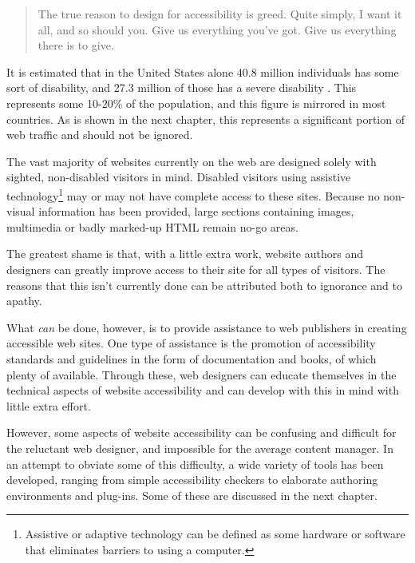 
\begin{quotation}

The true reason to design for accessibility is greed. Quite simply, I want it
all, and so should you. Give us everything you've got. Give us everything there
is to give.  \cite{joeclark}

\end{quotation}

It is estimated that in the United States alone 40.8 million individuals has
some sort of disability, and 27.3 million of those has a severe disability
\cite{webaim}. This represents some 10-20\% of the population, and this figure
is mirrored in most countries. As is shown in the next chapter, this represents
a significant portion of web traffic and should not be ignored.

The vast majority of websites currently on the web are designed solely with
sighted, non-disabled visitors in mind. Disabled visitors using assistive
technology\footnote{Assistive or adaptive technology can be defined as some
hardware or software that eliminates barriers to using a computer.} may or may
not have complete access to these sites. Because no non-visual information has
been provided, large sections containing images, multimedia or badly marked-up
HTML remain no-go areas.

The greatest shame is that, with a little extra work, website authors and
designers can greatly improve access to their site for all types of visitors.
The reasons that this isn't currently done can be attributed both to ignorance and
to apathy.

What \emph{can} be done, however, is to provide assistance to web publishers in
creating accessible web sites. One type of assistance is the promotion of
accessibility standards and guidelines in the form of documentation and books, 
of which plenty of available. Through these, web designers can 
educate themselves in the technical aspects of website accessibility and can develop
with this in mind with little extra effort. 

However, some aspects of website accessibility can be confusing and difficult
for the reluctant web designer, and impossible for the average content manager.
In an attempt to obviate some of this difficulty, a wide variety of tools
has been developed, ranging from simple accessibility checkers to elaborate
authoring environments and plug-ins. Some of these are discussed in the 
next chapter.

